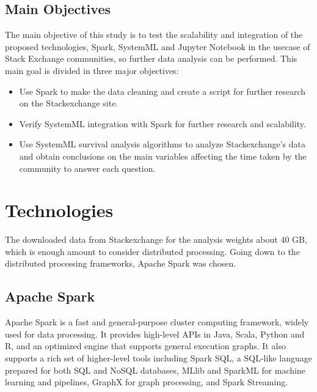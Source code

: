 \documentclass[11pt]{article} %
\begin{document}
  \subsection{Main Objectives}

    The main objective of this study is to test the scalability and integration of the proposed technologies, Spark, SystemML and Jupyter Notebook in the usecase of Stack Exchange communities, so further data analysis can be performed. This main goal is divided in three major objectives:

    \begin{itemize}

      \item Use Spark to make the data cleaning and create a script for further research on the Stackexchange site.

      \item Verify SystemML integration with Spark for further research and scalability.

      \item Use SystemML survival analysis algorithms to analyze Stackexchange's data and obtain conclusions on the main variables affecting the time taken by the community to answer each question.

    \end{itemize}

\newpage

\section{Technologies}
  \label{sec:technologies}

  The downloaded data from Stackexchange for the analysis weights about 40 GB, which is enough amount to consider distributed processing. Going down to the distributed processing frameworks, Apache Spark was chosen.

  \subsection{Apache Spark}

    Apache Spark is a fast and general-purpose cluster computing framework, widely used for data processing. It provides high-level APIs in Java, Scala, Python and R, and an optimized engine that supports general execution graphs. It also supports a rich set of higher-level tools including Spark SQL, a SQL-like language prepared for both SQL and NoSQL databases, MLlib and SparkML for machine learning and pipelines, GraphX for graph processing, and Spark Streaming.
\end{document}
